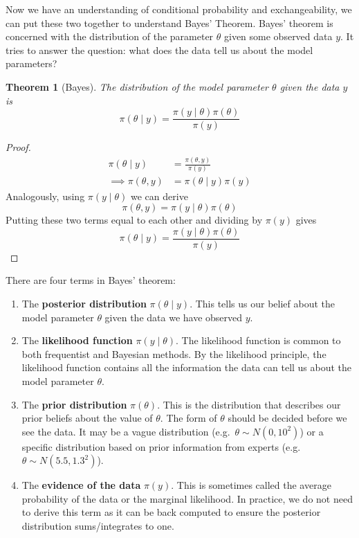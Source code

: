 \documentclass[
]{book}
\providecommand{\tightlist}{%
  \setlength{\itemsep}{0pt}\setlength{\parskip}{0pt}}
\newtheorem{theorem}{Theorem}[chapter]
\theoremstyle{definition}
\theoremstyle{definition}
\theoremstyle{definition}
\theoremstyle{definition}
\theoremstyle{remark}
\begin{document}
Now we have an understanding of conditional probability and exchangeability, we can put these two together to understand Bayes' Theorem. Bayes' theorem is concerned with the distribution of the parameter \(\theta\) given some observed data \(y\). It tries to answer the question: what does the data tell us about the model parameters?

\begin{theorem}[Bayes]
The distribution of the model parameter \(\theta\) given the data \(y\) is
\[
\pi(\theta \mid y) = \frac{\pi(y \mid \theta)\pi(\theta)}{\pi(y)}
\]
\end{theorem}

\begin{proof}
\begin{align}
\pi(\theta \mid y) &= \frac{\pi(\theta, y)}{\pi(y)}\\
\implies \pi(\theta, y) &= \pi(\theta \mid y)\pi(y)
\end{align}
Analogously, using \(\pi(y \mid \theta)\) we can derive
\[
\pi(\theta, y) = \pi(y \mid \theta)\pi(\theta)
\]
Putting these two terms equal to each other and dividing by \(\pi(y)\) gives
\[
\pi(\theta \mid y) = \frac{\pi(y \mid \theta)\pi(\theta)}{\pi(y)}
\]
\end{proof}

There are four terms in Bayes' theorem:

\begin{enumerate}
\def\labelenumi{\arabic{enumi}.}
\tightlist
\item
  The \textbf{posterior distribution} \(\pi(\theta \mid y)\). This tells us our belief about the model parameter \(\theta\) given the data we have observed \(y\).
\item
  The \textbf{likelihood function} \(\pi(y \mid \theta)\). The likelihood function is common to both frequentist and Bayesian methods. By the likelihood principle, the likelihood function contains all the information the data can tell us about the model parameter \(\theta\).
\item
  The \textbf{prior distribution} \(\pi(\theta)\). This is the distribution that describes our prior beliefs about the value of \(\theta\). The form of \(\theta\) should be decided before we see the data. It may be a vague distribution (e.g.~\(\theta \sim N(0, 10^2)\)) or a specific distribution based on prior information from experts (e.g.~\(\theta \sim N(5.5, 1.3^2)\)).\\
\item
  The \textbf{evidence of the data} \(\pi(y)\). This is sometimes called the average probability of the data or the marginal likelihood. In practice, we do not need to derive this term as it can be back computed to ensure the posterior distribution sums/integrates to one.
\end{enumerate}
\end{document}
